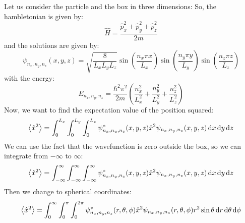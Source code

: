 \documentclass{article}
\begin{document}
Let us consider the particle and the box in three dimensions:
So, the hambletonian is given by:
\begin{equation}
    \hat{H} = \frac{\hat{p}_x^2 + \hat{p}_y^2 + \hat{p}_z^2}{2m}
\end{equation}
and the solutions are given by:
\begin{equation}
    \psi_{n_x,n_y,n_z}(x,y,z) = \sqrt{\frac{8}{L_x L_y L_z}} \sin\left(\frac{n_x \pi x}{L_x}\right) \sin\left(\frac{n_y \pi y}{L_y}\right) \sin\left(\frac{n_z \pi z}{L_z}\right)
\end{equation}
with the energy:
\begin{equation}
    E_{n_x,n_y,n_z} = \frac{\hbar^2 \pi^2}{2m} \left(\frac{n_x^2}{L_x^2} + \frac{n_y^2}{L_y^2} + \frac{n_z^2}{L_z^2}\right)
\end{equation}
Now, we want to find the expectation value of the position squared:
\begin{equation}
    \expval{\hat{x}^2} = \int_{0}^{L_x} \int_{0}^{L_y} \int_{0}^{L_z} \psi_{n_x,n_y,n_z}^*(x,y,z) \hat{x}^2 \psi_{n_x,n_y,n_z}(x,y,z) \dd{x} \dd{y} \dd{z}
\end{equation}
We can use the fact that the wavefunction is zero outside the box, so we can integrate from $-\infty$ to $\infty$:
\begin{equation}
    \expval{\hat{x}^2} = \int_{-\infty}^{\infty} \int_{-\infty}^{\infty} \int_{-\infty}^{\infty} \psi_{n_x,n_y,n_z}^*(x,y,z) \hat{x}^2 \psi_{n_x,n_y,n_z}(x,y,z) \dd{x} \dd{y} \dd{z}
\end{equation}
Then we change to spherical coordinates:
\begin{equation}
    \expval{\hat{x}^2} = \int_{0}^{\infty} \int_{0}^{\pi} \int_{0}^{2\pi} \psi_{n_x,n_y,n_z}^*(r,\theta,\phi) \hat{x}^2 \psi_{n_x,n_y,n_z}(r,\theta,\phi) r^2 \sin\theta \dd{r} \dd{\theta} \dd{\phi}
\end{equation}
\end{document}

